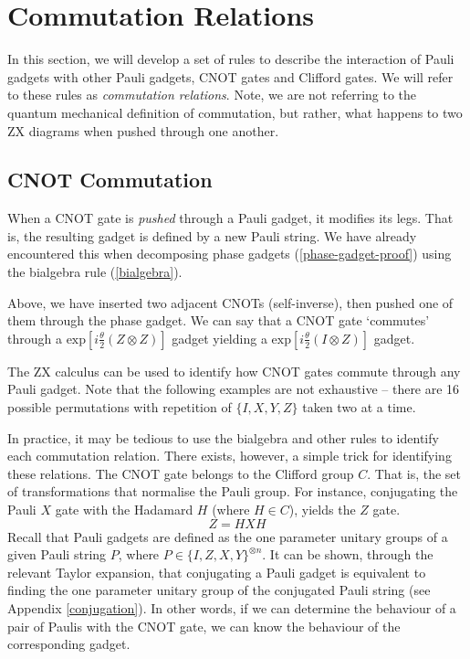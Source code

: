 \section{Commutation Relations}

In this section, we will develop a set of rules to describe the interaction of Pauli gadgets with other Pauli gadgets, CNOT gates and Clifford gates. We will refer to these rules as \textit{commutation relations}. Note, we are not referring to the quantum mechanical definition of commutation, but rather, what happens to two ZX diagrams when pushed through one another.

\subsection{CNOT Commutation}

When a CNOT gate is \textit{pushed} through a Pauli gadget, it modifies its legs. That is, the resulting gadget is defined by a new Pauli string. We have already encountered this when decomposing phase gadgets (\ref{phase-gadget-proof}) using the bialgebra rule (\ref{bialgebra}).


Above, we have inserted two adjacent CNOTs (self-inverse), then pushed one of them through the phase gadget. We can say that a CNOT gate `commutes' through a $\text{exp} [i\frac{\theta}{2} (Z \otimes Z)]$ gadget yielding a $\text{exp} [i\frac{\theta}{2} (I \otimes Z)]$ gadget.


The ZX calculus can be used to identify how CNOT gates commute through any Pauli gadget. Note that the following examples are not exhaustive -- there are 16 possible permutations with repetition of $\{I, X, Y, Z\}$ taken two at a time.


In practice, it may be tedious to use the bialgebra and other rules to identify each commutation relation. There exists, however, a simple trick for identifying these relations. The CNOT gate belongs to the Clifford group $C$. That is, the set of transformations that normalise the Pauli group. For instance, conjugating the Pauli $X$ gate with the Hadamard $H$ (where $H \in C$), yields the $Z$ gate.
\begin{equation*}
    Z = HXH
\end{equation*}
Recall that Pauli gadgets are defined as the one parameter unitary groups of a given Pauli string $P$, where $P \in \{I, Z, X, Y\}^{\otimes n}$. It can be shown, through the relevant Taylor expansion, that conjugating a Pauli gadget is equivalent to finding the one parameter unitary group of the conjugated Pauli string (see Appendix \ref{conjugation}). In other words, if we can determine the behaviour of a pair of Paulis with the CNOT gate, we can know the behaviour of the corresponding gadget.

